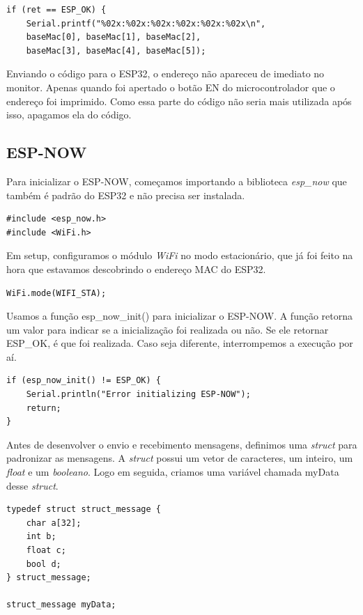 \documentclass[12pt]{article}
\begin{document}
\begin{lstlisting}
if (ret == ESP_OK) {
    Serial.printf("%02x:%02x:%02x:%02x:%02x:%02x\n",
    baseMac[0], baseMac[1], baseMac[2],
    baseMac[3], baseMac[4], baseMac[5]);
\end{lstlisting}

Enviando o código para o ESP32, o endereço não apareceu de imediato no monitor. Apenas quando foi apertado o botão EN do microcontrolador que o endereço foi imprimido. Como essa parte do código não seria mais utilizada após isso, apagamos ela do código.

\subsection{ESP-NOW}

Para inicializar o ESP-NOW, começamos importando a biblioteca \textit{esp\_now} que também é padrão do ESP32 e não precisa ser instalada.

\begin{lstlisting}
#include <esp_now.h>
#include <WiFi.h>
\end{lstlisting}

Em setup, configuramos o módulo \textit{WiFi} no modo estacionário, que já foi feito na hora que estavamos descobrindo o endereço MAC do ESP32. 

\begin{lstlisting}
WiFi.mode(WIFI_STA);
\end{lstlisting}

Usamos a função esp\_now\_init() para inicializar o ESP-NOW. A função retorna um valor para indicar se a inicialização foi realizada ou não. Se ele retornar ESP\_OK, é que foi realizada. Caso seja diferente, interrompemos a execução por aí.

\begin{lstlisting}
if (esp_now_init() != ESP_OK) {
    Serial.println("Error initializing ESP-NOW");
    return;
}
\end{lstlisting}

Antes de desenvolver o envio e recebimento mensagens, definimos uma \textit{struct} para padronizar as mensagens. A \textit{struct} possui um vetor de caracteres, um inteiro, um \textit{float} e um \textit{booleano}. Logo em seguida, criamos uma variável chamada myData desse \textit{struct}.

\begin{lstlisting}
typedef struct struct_message {
    char a[32];
    int b;
    float c;
    bool d;
} struct_message;

struct_message myData;
\end{lstlisting}
\end{document}
